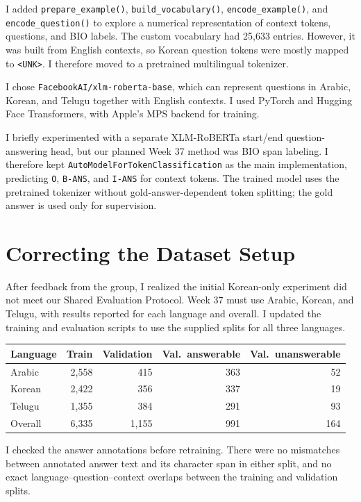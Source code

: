 \documentclass[a4paper,11pt]{article}
\begin{document}
I added \texttt{prepare\_example()}, \texttt{build\_vocabulary()}, \texttt{encode\_example()}, and \texttt{encode\_question()} to explore a numerical representation of context tokens, questions, and BIO labels. The custom vocabulary had 25,633 entries. However, it was built from English contexts, so Korean question tokens were mostly mapped to \texttt{<UNK>}. I therefore moved to a pretrained multilingual tokenizer.

I chose \texttt{FacebookAI/xlm-roberta-base}, which can represent questions in Arabic, Korean, and Telugu together with English contexts. I used PyTorch and Hugging Face Transformers, with Apple's MPS backend for training.

I briefly experimented with a separate XLM-RoBERTa start/end question-answering head, but our planned Week 37 method was BIO span labeling. I therefore kept \texttt{AutoModelForTokenClassification} as the main implementation, predicting \texttt{O}, \texttt{B-ANS}, and \texttt{I-ANS} for context tokens. The trained model uses the pretrained tokenizer without gold-answer-dependent token splitting; the gold answer is used only for supervision.

\section{Correcting the Dataset Setup}

After feedback from the group, I realized the initial Korean-only experiment did not meet our Shared Evaluation Protocol. Week 37 must use Arabic, Korean, and Telugu, with results reported for each language and overall. I updated the training and evaluation scripts to use the supplied splits for all three languages.

\begin{center}
\small
\begin{tabular}{lrrrr}
\toprule
Language & Train & Validation & Val.\ answerable & Val.\ unanswerable \\
\midrule
Arabic & 2,558 & 415 & 363 & 52 \\
Korean & 2,422 & 356 & 337 & 19 \\
Telugu & 1,355 & 384 & 291 & 93 \\
\midrule
Overall & 6,335 & 1,155 & 991 & 164 \\
\bottomrule
\end{tabular}
\end{center}

I checked the answer annotations before retraining. There were no mismatches between annotated answer text and its character span in either split, and no exact language--question--context overlaps between the training and validation splits.
\end{document}
